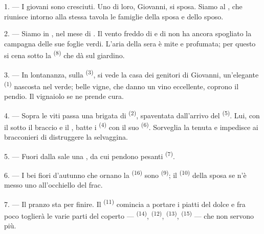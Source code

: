 \VUsaut{1.6mm}
\VUsaut{2.6mm}

\VUsaut{3.0mm}

1. --- I giovani sono cresciuti. Uno di loro, Giovanni, si sposa. Siamo al
, che riunisce intorno alla stessa tavola le famiglie della
sposa e dello sposo.

2. --- Siamo in , nel mese di . Il vento freddo di
 e di  non ha ancora spogliato la campagna delle sue
foglie verdi. L'aria della sera è mite e profumata; per questo si cena sotto la
 \textsuperscript{(8)} che dà sul giardino.

3. --- In lontananza, sulla  \textsuperscript{(3)}, si vede la casa dei
genitori di Giovanni, un'elegante  \textsuperscript{(1)}
nascosta nel verde; belle vigne, che danno un vino eccellente, coprono il pendio. Il
vignaiolo se ne prende cura.

4. --- Sopra le viti passa una brigata di  \textsuperscript{(2)},
spaventata dall'arrivo del  \textsuperscript{(5)}. Lui, con il
 sotto il braccio e il , batte i
 \textsuperscript{(4)} con il suo 
\textsuperscript{(6)}. Sorveglia la tenuta e impedisce ai bracconieri di distruggere
la selvaggina.

5. --- Fuori dalla  sale una , da cui pendono
pesanti  \textsuperscript{(7)}.

6. --- I bei fiori d'autunno che ornano la  \textsuperscript{(16)} sono
 \textsuperscript{(9)}; il  \textsuperscript{(10)}
della sposa se n'è messo uno all'occhiello del frac.

7. --- Il pranzo sta per finire. Il  \textsuperscript{(11)} comincia
a portare i piatti del dolce e fra poco toglierà le varie parti del coperto ---
 \textsuperscript{(14)},  \textsuperscript{(12)},
 \textsuperscript{(13)}, 
\textsuperscript{(15)} --- che non servono più.

